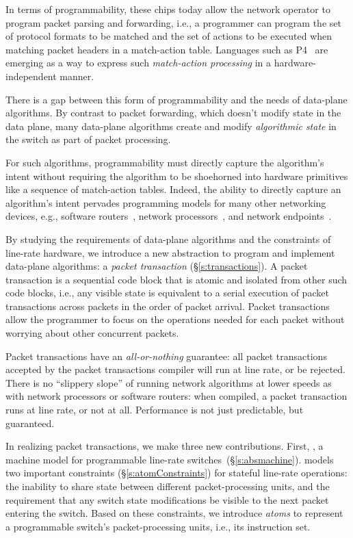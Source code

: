 In terms of programmability, these chips today allow the network operator to
program packet parsing and forwarding, i.e., a programmer can program the set
of protocol formats to be matched and the set of actions to be executed when
matching packet headers in a match-action table. Languages such as P4~\cite{p4}
are emerging as a way to express such {\em match-action processing} in a
hardware-independent manner.

There is a gap between this form of programmability and the needs of data-plane
algorithms. By contrast to packet forwarding, which doesn't modify state in the
data plane, many data-plane algorithms create and modify {\em algorithmic
state} in the switch as part of packet processing.

For such algorithms, programmability must directly capture the algorithm's
intent without requiring the algorithm to be shoehorned into hardware
primitives like a sequence of match-action tables. Indeed, the ability to
directly capture an algorithm's intent pervades programming models for many
other networking devices, e.g., software routers~\cite{click}, network
processors~\cite{packetc}, and network endpoints~\cite{qdisc}.

By studying the requirements of data-plane algorithms and the constraints of
line-rate hardware, we introduce a new abstraction to program and implement
data-plane algorithms: a {\em packet transaction} (\S\ref{s:transactions}). A
packet transaction is a sequential code block that is atomic and isolated from
other such code blocks, i.e., any visible state is equivalent to a serial
execution of packet transactions across packets in the order of packet
arrival.  Packet transactions allow the programmer to focus on the operations
needed for each packet without worrying about other concurrent packets.

Packet transactions have an \textit{all-or-nothing} guarantee: all packet
transactions accepted by the packet transactions compiler will run at line
rate, or be rejected.  There is no ``slippery slope'' of running network
algorithms at lower speeds as with network processors or software routers: when
compiled, a packet transaction runs at line rate, or not at all.  Performance
is not just predictable, but guaranteed.

In realizing packet transactions, we make three new contributions.  First, {\em
\absmachine}, a machine model for programmable line-rate
switches~(\S\ref{s:absmachine}).  \absmachine models two important constraints
(\S\ref{s:atomConstraints}) for stateful line-rate operations: the inability to
share state between different packet-processing units, and the requirement that
any switch state modifications be visible to the next packet entering the
switch. Based on these constraints, we introduce {\em atoms} to represent a
programmable switch's packet-processing units, i.e., its instruction set.

